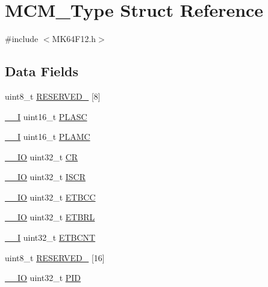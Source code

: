 \hypertarget{struct_m_c_m___type}{}\section{M\+C\+M\+\_\+\+Type Struct Reference}
\label{struct_m_c_m___type}


{\ttfamily \#include $<$M\+K64\+F12.\+h$>$}

\subsection*{Data Fields}
\begin{DoxyCompactItemize}
\item 
uint8\+\_\+t \mbox{\hyperlink{group___v_r_e_f___peripheral___access___layer_gab5b3e978eb3ceb8a2aadaeeab28db00b}{R\+E\+S\+E\+R\+V\+E\+D\+\_}} \mbox{[}8\mbox{]}
\item 
\mbox{\hyperlink{core__cm4_8h_af63697ed9952cc71e1225efe205f6cd3}{\+\_\+\+\_\+I}} uint16\+\_\+t \mbox{\hyperlink{group___v_r_e_f___peripheral___access___layer_ga59d6723930c0cbfd56a7451ec569b598}{P\+L\+A\+SC}}
\item 
\mbox{\hyperlink{core__cm4_8h_af63697ed9952cc71e1225efe205f6cd3}{\+\_\+\+\_\+I}} uint16\+\_\+t \mbox{\hyperlink{group___v_r_e_f___peripheral___access___layer_ga951da47dda3dfe3452e96e494178fad4}{P\+L\+A\+MC}}
\item 
\mbox{\hyperlink{core__cm4_8h_aec43007d9998a0a0e01faede4133d6be}{\+\_\+\+\_\+\+IO}} uint32\+\_\+t \mbox{\hyperlink{group___v_r_e_f___peripheral___access___layer_gab40c89c59391aaa9d9a8ec011dd0907a}{CR}}
\item 
\mbox{\hyperlink{core__cm4_8h_aec43007d9998a0a0e01faede4133d6be}{\+\_\+\+\_\+\+IO}} uint32\+\_\+t \mbox{\hyperlink{group___v_r_e_f___peripheral___access___layer_ga0e8f6d2b4768813502c16962a6c75e44}{I\+S\+CR}}
\item 
\mbox{\hyperlink{core__cm4_8h_aec43007d9998a0a0e01faede4133d6be}{\+\_\+\+\_\+\+IO}} uint32\+\_\+t \mbox{\hyperlink{group___v_r_e_f___peripheral___access___layer_gaedae6a32773e8626b678e67a1f6b13d6}{E\+T\+B\+CC}}
\item 
\mbox{\hyperlink{core__cm4_8h_aec43007d9998a0a0e01faede4133d6be}{\+\_\+\+\_\+\+IO}} uint32\+\_\+t \mbox{\hyperlink{group___v_r_e_f___peripheral___access___layer_gace579fc1ab2fca46ff5f20200744c4f1}{E\+T\+B\+RL}}
\item 
\mbox{\hyperlink{core__cm4_8h_af63697ed9952cc71e1225efe205f6cd3}{\+\_\+\+\_\+I}} uint32\+\_\+t \mbox{\hyperlink{group___v_r_e_f___peripheral___access___layer_ga97b3c7397055c35f026f3004ad845275}{E\+T\+B\+C\+NT}}
\item 
uint8\+\_\+t \mbox{\hyperlink{group___v_r_e_f___peripheral___access___layer_ga751eb9bad252d2a0d98a9d0f0c8ae7d4}{R\+E\+S\+E\+R\+V\+E\+D\+\_}} \mbox{[}16\mbox{]}
\item 
\mbox{\hyperlink{core__cm4_8h_aec43007d9998a0a0e01faede4133d6be}{\+\_\+\+\_\+\+IO}} uint32\+\_\+t \mbox{\hyperlink{group___v_r_e_f___peripheral___access___layer_ga83109858f979abb8e707b989d88d54bf}{P\+ID}}
\end{DoxyCompactItemize}


